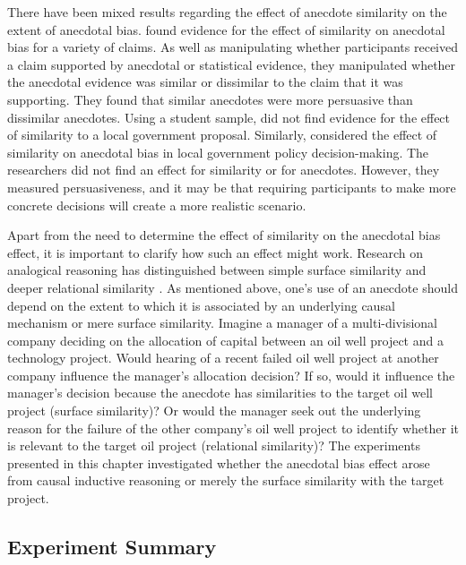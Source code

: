 \documentclass[a4paper, nobind]{templates/ociamthesis}
\theoremstyle{definition}
\theoremstyle{definition}
\theoremstyle{definition}
\theoremstyle{definition}
\theoremstyle{remark}
\begin{document}
There have been mixed results regarding the effect of anecdote similarity on the
extent of anecdotal bias. \textcite[Study~3]{hoeken2009} found evidence for the effect of
similarity on anecdotal bias for a variety of claims. As well as manipulating
whether participants received a claim supported by anecdotal or statistical
evidence, they manipulated whether the anecdotal evidence was similar or
dissimilar to the claim that it was supporting. They found that similar
anecdotes were more persuasive than dissimilar anecdotes. Using a student
sample, \textcite{hoeken2001} did not find evidence for the effect of similarity to a
local government proposal. Similarly, \textcite{hornikx2018} considered the effect of
similarity on anecdotal bias in local government policy decision-making. The
researchers did not find an effect for similarity or for anecdotes. However,
they measured persuasiveness, and it may be that requiring participants to make
more concrete decisions will create a more realistic scenario.

Apart from the need to determine the effect of similarity on the anecdotal bias
effect, it is important to clarify how such an effect might work. Research on
analogical reasoning has distinguished between simple surface similarity and
deeper relational similarity \autocite{gentner1983}. As mentioned above, one's use of an
anecdote should depend on the extent to which it is associated by an underlying
causal mechanism or mere surface similarity. Imagine a manager of a
multi-divisional company deciding on the allocation of capital between an oil
well project and a technology project. Would hearing of a recent failed oil well
project at another company influence the manager's allocation decision? If so,
would it influence the manager's decision because the anecdote has similarities
to the target oil well project (surface similarity)? Or would the manager seek
out the underlying reason for the failure of the other company's oil well
project to identify whether it is relevant to the target oil project (relational
similarity)? The experiments presented in this chapter investigated whether the
anecdotal bias effect arose from causal inductive reasoning or merely the
surface similarity with the target project.

\subsection{Experiment Summary}
\end{document}
